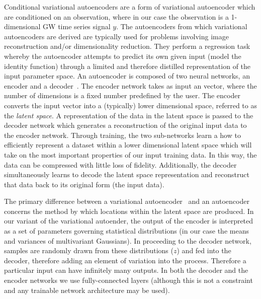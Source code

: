\documentclass[%
showpacs,
 amsmath,amssymb,
 aps,
 twocolumn,
 prl,
 reprint,
floatfix,
]{revtex4-1}
\begin{document}
%
%
Conditional variational autoencoders are a form of variational autoencoder
which are conditioned on an observation, where in our case the observation is a
1-dimensional \ac{GW} time series signal $y$. The autoencoders from which
variational autoencoders are derived are typically used for problems involving
image reconstruction and/or dimensionality reduction. They perform a regression
task whereby the autoencoder attempts to predict its own given input (model the
identity function) through a limited and therefore distilled representation of
the input parameter space. An autoencoder is composed of two neural networks,
an encoder and a decoder~\cite{LIOU20083150}. The encoder network takes as
input an vector, where the number of
dimensions is a fixed number predefined by the user. The encoder converts the
input vector into a (typically) lower dimensional space,
referred to as the {\it{latent space}}. A representation of the data in the
latent space is passed to the decoder network which generates a reconstruction
of the original input data to the encoder network. Through training, the two
sub-networks learn a how to efficiently represent a dataset within a lower
dimensional latent space which will take on the most important properties of
our input training data. In this way, the data can be compressed with little
loss of fidelity. Additionally, the decoder simultaneously learns to decode the
latent space representation and reconstruct that data back to its original form
(the input data). 

%
%
The primary difference between a variational autoencoder~\cite{1812.04405} and
an autoencoder concerns the method by which locations within the latent space
are produced. In our variant of the variational autoender, the output of the
encoder is interpreted as a set of parameters governing statistical
distributions (in our case the means and variances of multivariant Gaussians).
In proceeding to the decoder network, samples are randomly drawn from these
distributions ($z$) and fed into the decoder, therefore adding an element of
variation into the process. Therefore a particular input can have infinitely
many outputs. In both the decoder and the encoder networks we use
fully-connected layers (although this is not a constraint and any trainable
network architecture may be used).
\end{document}
